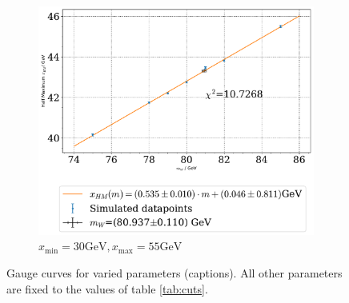 \documentclass[11pt,a4paper,notitlepage]{scrartcl}
\begin{document}
\begin{figure}[H]
	\begin{subfigure}{0.49\linewidth}
		\includegraphics[width=\linewidth]{P1_pics/gauge_results/gauge_xmin_30_xmax_55.pdf}
		\caption{$x_\text{min}=30\text{GeV}, x_\text{max}=55\text{GeV}$}
	\end{subfigure}
	\caption{Gauge curves for varied parameters (captions). All other parameters are fixed to the values of table \ref{tab:cuts}.}\label{fig:gauge_curve_rest}
\end{figure}
\newpage


\printbibliography[heading=bibintoc]
\end{document}
